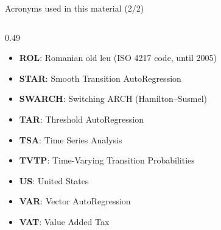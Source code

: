 \begin{frame}{Acronyms used in this material (2/2)}
\begin{columns}[T]
\begin{column}{0.49\textwidth}
\begin{itemize}
    \item \textbf{ROL}: Romanian old leu (ISO 4217 code, until 2005)
    \item \textbf{STAR}: Smooth Transition AutoRegression
    \item \textbf{SWARCH}: Switching ARCH (Hamilton–Susmel)
    \item \textbf{TAR}: Threshold AutoRegression
    \item \textbf{TSA}: Time Series Analysis
    \item \textbf{TVTP}: Time-Varying Transition Probabilities
    \item \textbf{US}: United States
    \item \textbf{VAR}: Vector AutoRegression
    \item \textbf{VAT}: Value Added Tax
\end{itemize}
\end{column}
\end{columns}
\end{frame}

